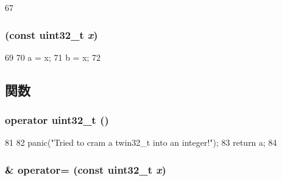 \begin{DoxyCode}
67     {}
\end{DoxyCode}
\hypertarget{structm5__twin32__t_ada9e89b2bf229d9b1f59fbe70d581d38}{
\subsubsection[{m5\_\-twin32\_\-t}]{ (const {\bf uint32\_\-t} {\em x})}}
\label{structm5__twin32__t_ada9e89b2bf229d9b1f59fbe70d581d38}



\begin{DoxyCode}
69     {
70         a = x;
71         b = x;
72     }
\end{DoxyCode}


\subsection{関数}
\hypertarget{structm5__twin32__t_a9e5f55cf6004b9dd31ffa23eea2da593}{
\subsubsection[{operator uint32\_\-t}]{\setlength{\rightskip}{0pt plus 5cm}operator {\bf uint32\_\-t} ()}}
\label{structm5__twin32__t_a9e5f55cf6004b9dd31ffa23eea2da593}



\begin{DoxyCode}
81     {
82         panic("Tried to cram a twin32_t into an integer!\n");
83         return a;
84     }
\end{DoxyCode}
\hypertarget{structm5__twin32__t_a0db32bac69e8c26d5901895896474601}{
\subsubsection[{operator=}]{\& operator= (const {\bf uint32\_\-t} {\em x})}}
\label{structm5__twin32__t_a0db32bac69e8c26d5901895896474601}



